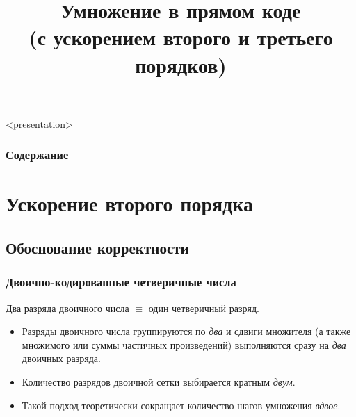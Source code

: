 


\title[Ускоренное умножение]{Умножение в прямом коде\\(с ускорением второго и третьего порядков)}

\setcounter{TaskSimpleCtr}{1}
\newcommand{\TaskSimpleNumber}{ \arabic{TaskSimpleCtr}) \addtocounter{TaskSimpleCtr}{1} }




\begin{frame}<presentation>
    \frametitle{Содержание}
    \tableofcontents
\end{frame}


\section{Ускорение второго порядка}


\subsection{Обоснование корректности}


\begin{frame}
    \frametitle{Двоично-кодированные четверичные числа}

    \begin{block}{}
        Два разряда двоичного числа $\equiv$ один четверичный разряд.
    \end{block}
    
    \begin{itemize}
        \item Разряды двоичного числа группируются по \emph{два} и сдвиги множителя (а также множимого или суммы частичных произведений) выполняются сразу на \emph{два} двоичных разряда. 
    
        \item Количество разрядов двоичной сетки выбирается кратным \emph{двум}.
    
        \item Такой подход теоретически сокращает количество шагов умножения \emph{вдвое}.
    \end{itemize}    
\end{frame}

